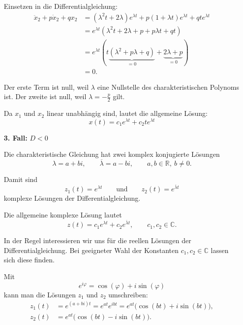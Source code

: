 \begin{enumerate}
          Einsetzen in die Differentialgleichung:
          \begin{align*}
              \ddot{x}_2+p\dot{x}_2+qx_2
               & =(\lambda^2t+2\lambda)e^{\lambda t}
              +p(1+\lambda t)e^{\lambda t}
              +qt e^{\lambda t}                                \\
               & =e^{\lambda t}
              \left(\lambda^2t+2\lambda+p+p\lambda t+qt\right) \\
               & =e^{\lambda t}
              \left(
              t\underbrace{(\lambda^2+p\lambda+q)}_{=0}
              +\underbrace{2\lambda+p}_{=0}
              \right)                                          \\
               & =0.
          \end{align*}

          Der erste Term ist null, weil \(\lambda\) eine Nullstelle des
          charakteristischen Polynoms ist. Der zweite ist null, weil
          \(\lambda=-\frac{p}{2}\) gilt.

          Da \(x_1\) und \(x_2\) linear unabhängig sind, lautet die
          allgemeine Lösung:
          \[
              \boxed{x(t)=c_1e^{\lambda t}+c_2t e^{\lambda t}}
          \]

    \item[\textbf{3. Fall:}] \textbf{\(D<0\)}

          Die charakteristische Gleichung hat zwei komplex konjugierte Lösungen
          \[
              \lambda=a+bi,
              \qquad
              \overline{\lambda}=a-bi,
              \qquad a,b\in\mathbb{R},\ b\neq 0.
          \]

          Damit sind
          \[
              z_1(t)=e^{\lambda t}
              \qquad\text{und}\qquad
              z_2(t)=e^{\overline{\lambda}t}
          \]
          komplexe Lösungen der Differentialgleichung.

          Die allgemeine komplexe Lösung lautet
          \[
              z(t)=c_1e^{\lambda t}+c_2e^{\overline{\lambda}t},
              \qquad c_1,c_2\in\mathbb{C}.
          \]

          In der Regel interessieren wir uns für die reellen Lösungen
          der Differentialgleichung. Bei geeigneter Wahl der Konstanten
          \(c_1,c_2\in\mathbb{C}\) lassen sich diese finden.

          Mit
          \[
              e^{i\varphi}=\cos(\varphi)+i\sin(\varphi)
          \]
          kann man die Lösungen \(z_1\) und \(z_2\) umschreiben:
          \begin{align*}
              z_1(t)
               & =e^{(a+bi)t}
              =e^{at}e^{ibt}
              =e^{at}\bigl(\cos(bt)+i\sin(bt)\bigr),    \\
              z_2(t)
               & =e^{at}\bigl(\cos(bt)-i\sin(bt)\bigr).
          \end{align*}


\end{enumerate}
